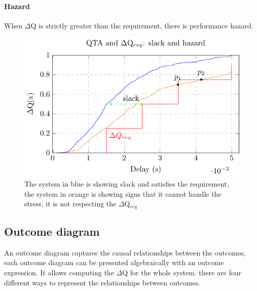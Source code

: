         \paragraph{Hazard} When $\Delta$Q is strictly greater than the requirement, there is performance hazard.

        \begin{figure}[H]
            \begin{center}
                \includegraphics[scale=1.4]{tikz/cdf_qta_slack.pdf}
            \end{center}
            \caption{The system in blue is showing slack and satisfies the requirement, the system in orange is showing signs that it cannot handle the stress, it is not respecting the $\Delta$Q$_{req}$}
        \end{figure}

   
    \subsection{Outcome diagram}
        An outcome diagram captures the causal relationships between the outcomes, each outcome diagram can be presented algebraically with an outcome expression.
        It allows computing the $\Delta$Q for the whole system.
        there are four different ways to represent the relationships between outcomes.

